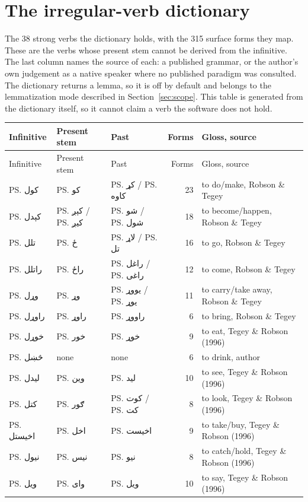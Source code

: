 \section{The irregular-verb dictionary}

The 38 strong verbs the dictionary holds, with the 315 surface forms they map. These are the verbs whose present stem cannot be derived from the infinitive. The last column names the source of each: a published grammar, or the author's own judgement as a native speaker where no published paradigm was consulted. The dictionary returns a lemma, so it is off by default and belongs to the lemmatization mode described in Section~\ref{sec:scope}. This table is generated from the dictionary itself, so it cannot claim a verb the software does not hold.

\footnotesize
\begin{longtable}{lllrl}
\toprule
Infinitive & Present stem & Past & Forms & Gloss, source\\
\endfirsthead
\toprule
Infinitive & Present stem & Past & Forms & Gloss, source\\
\endhead
\midrule
\ps{کول} & \ps{کو} & \ps{کړ} / \ps{کاوه} & 23 & to do/make, Robson \& Tegey\\
\ps{کېدل} & \ps{کېږ} / \ps{کیږ} & \ps{شو} / \ps{شول} & 18 & to become/happen, Robson \& Tegey\\
\ps{تلل} & \ps{ځ} & \ps{لاړ} / \ps{تل} & 16 & to go, Robson \& Tegey\\
\ps{راتلل} & \ps{راځ} & \ps{راغل} / \ps{راغی} & 12 & to come, Robson \& Tegey\\
\ps{وړل} & \ps{وړ} & \ps{یووړ} / \ps{یوړ} & 11 & to carry/take away, Robson \& Tegey\\
\ps{راوړل} & \ps{راوړ} & \ps{راووړ} & 6 & to bring, Robson \& Tegey\\
\ps{خوړل} & \ps{خور} & \ps{خوړ} & 9 & to eat, Tegey \& Robson (1996)\\
\ps{څښل} & none & none & 6 & to drink, author\\
\ps{لیدل} & \ps{وین} & \ps{لید} & 10 & to see, Tegey \& Robson (1996)\\
\ps{کتل} & \ps{ګور} & \ps{کوت} / \ps{کت} & 8 & to look, Tegey \& Robson (1996)\\
\ps{اخیستل} & \ps{اخل} & \ps{اخیست} & 9 & to take/buy, Tegey \& Robson (1996)\\
\ps{نیول} & \ps{نیس} & \ps{نیو} & 8 & to catch/hold, Tegey \& Robson (1996)\\
\ps{ویل} & \ps{وای} & \ps{ویل} & 10 & to say, Tegey \& Robson (1996)\\

\end{longtable}
